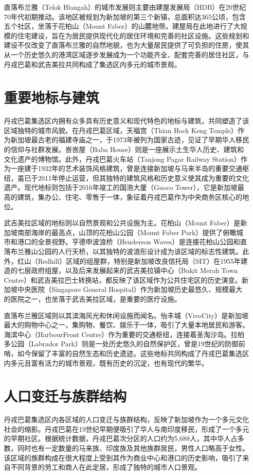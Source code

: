 \documentclass[11pt,a4paper,twoside,openany]{book}
\begin{document}
直落布兰雅（Telok Blangah）的城市发展则主要由建屋发展局（HDB）在20世纪70年代初期推动。该地区被规划为新加坡的第三个新镇，总面积达365公顷，包含五个社区，坐落于花柏山（Mount Faber）的山麓地带。建屋局在此地进行了大规模的住宅建设，旨在为居民提供现代化的居住环境和完善的社区设施。这些规划和建设不仅改变了直落布兰雅的自然地貌，也为大量居民提供了可负担的住房，使其从一个历史悠久的港湾区域逐步发展成为一个功能齐全、配套完善的居住社区，与丹戎巴葛和武吉美拉共同构成了集选区内多元的城市景观。

\section{重要地标与建筑}
丹戎巴葛集选区内拥有众多具有历史意义和现代特色的地标与建筑，共同塑造了该区域独特的城市风貌。在丹戎巴葛区域，天福宫（Thian Hock Keng Temple）作为新加坡最古老的福建寺庙之一，于1973年被列为国家古迹，见证了早期华人移民的信仰与社群发展。峇峇屋（Baba House）则是一座展示土生华人历史、建筑和文化遗产的博物馆。此外，丹戎巴葛火车站（Tanjong Pagar Railway Station）作为一座建于1932年的艺术装饰风格建筑，曾是连接新加坡与马来半岛的重要交通枢纽，虽已于2011年停止运营，但其独特的建筑风格和历史意义使其成为重要的文化遗产。现代地标则包括于2016年竣工的国浩大厦（Guoco Tower），它是新加坡最高的建筑，集办公、住宅、零售于一体，象征着丹戎巴葛作为中央商务区核心的地位。

武吉美拉区域的地标则以自然景观和公共设施为主。花柏山（Mount Faber）是新加坡南部海岸的最高点，山顶的花柏山公园（Mount Faber Park）提供了俯瞰城市和港口的全景视野。亨德申波浪桥（Henderson Waves）是连接花柏山公园和直落布兰雅山公园的人行天桥，以其独特的波浪形设计成为该区域的标志性建筑。此外，红山（Redhill）区域的组屋群，特别是新加坡改良信托局（SIT）在1955年建造的七层政府组屋，以及后来发展起来的武吉美拉镇中心（Bukit Merah Town Centre）和武吉美拉巴士转换站，都反映了该区域作为公共住宅区的历史演变。新加坡中央医院（Singapore General Hospital）作为新加坡历史最悠久、规模最大的医院之一，也坐落于武吉美拉区域，是重要的医疗设施。

直落布兰雅区域则以其滨海风光和休闲设施而闻名。怡丰城（VivoCity）是新加坡最大的购物中心之一，集购物、餐饮、娱乐于一体，吸引了大量本地居民和游客。海滨中心（HarbourFront Centre）作为重要的交通枢纽，连接着圣淘沙岛。拉柏多公园（Labrador Park）则是一处历史悠久的自然保护区，曾是19世纪的防御前哨，如今保留了丰富的自然生态和历史遗迹。这些地标共同构成了丹戎巴葛集选区内多元且富有活力的城市景观，既有历史的沉淀，也有现代的繁华。

\section{人口变迁与族群结构}
丹戎巴葛集选区内各区域的人口变迁与族群结构，反映了新加坡作为一个多元文化社会的缩影。丹戎巴葛在19世纪早期便吸引了华人与南印度移民，形成了一个多元的早期社区。根据统计数据，丹戎巴葛次分区的人口约为5,688人，其中华人占多数，同时也有一定数量的马来族、印度族及其他族群居民，男性人口略高于女性。该区域的族群构成在很大程度上受到其作为商业中心和港口的历史影响，吸引了来自不同背景的劳工和商人在此定居，形成了独特的城市人口景观。
\end{document}
